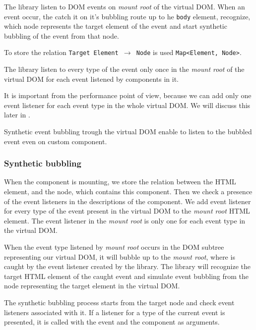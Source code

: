     The \tiles library listen to DOM events on \textit{mount root} of the virtual DOM.
    When an event occur, the \tiles catch it on it's bubbling route up to he \texttt{body} element, 
    recognize, which node represents the target element of the event and start synthetic bubbling of the event from that node. 

    To store the relation \mbox{\texttt{Target Element $\rightarrow$ Node}} is used \texttt{Map<Element, Node>}.

    The \tiles library listen to every type of the event only once in the \textit{mount root} 
    of the virtual DOM for each event listened by components in it.

    It is important from the performance point of view, because we can add only one event listener for each event type in the whole virtual DOM.
    We will discuss this later in .

    Synthetic event bubbling trough the virtual DOM enable to listen to the bubbled event even on custom component.

    \subsubsection{Synthetic bubbling}\label{subsec:our-architecture-events-bubbling}

      When the component is mounting, we store the relation between the HTML element, and the node, which contains this component. 
      Then we check a presence of the event listeners in the descriptions of the component. 
      We add event listener for every type of the event present in the virtual DOM to the \textit{mount root} HTML element. 
      The event listener in the \textit{mount root} is only one for each event type in the virtual DOM.

      When the event type listened by \textit{mount root} occurs in the DOM subtree representing our virtual DOM, 
      it will bubble up to the \textit{mount root}, where is caught by the event listener created by the \tiles library. 
      The \tiles library will recognize the target HTML element of the caught event 
      and simulate event bubbling from the node representing the target element in the virtual DOM.

      The synthetic bubbling process starts from the target node and check event listeners associated with it.
      If a listener for a type of the current event is presented, it is called with the event and the component as arguments. 

